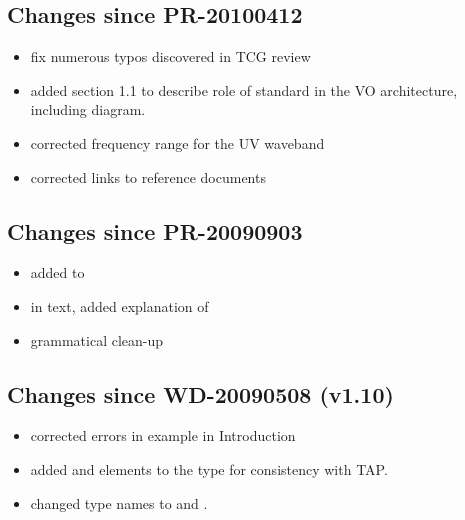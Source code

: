 \documentclass[11pt,a4paper]{ivoa}
\begin{document}
\subsection{Changes since PR-20100412}

\begin{itemize}
  \item fix numerous typos discovered in TCG review
  \item added section 1.1 to describe role of standard in the VO
       architecture, including diagram.
  \item corrected frequency range for the UV waveband
  \item corrected links to reference documents
\end{itemize}

\subsection{Changes since PR-20090903}

\begin{itemize}
  \item added 
       to 
  \item in text, added explanation of
  \item grammatical clean-up
\end{itemize}

\subsection{Changes since WD-20090508 (v1.10)}

\begin{itemize}
  \item corrected errors in example in Introduction
  \item added  and
        elements to the
        type for consistency with TAP.
  \item changed type names  to
        and 
       .
\end{itemize}


\end{document}
